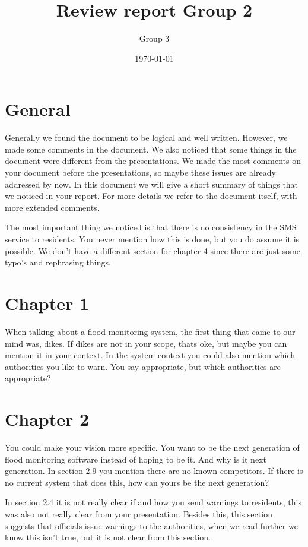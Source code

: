 \documentclass[a4paper,10pt]{article}
\author{Group 3}
\date{\today}
\title{Review report Group 2}
\begin{document}
\maketitle

\section{General}
Generally we found the document to be logical and well written. However, we made some comments in the document. We also noticed that some things in the document were different from the presentations. We made the most comments on your document before the presentations, so maybe these issues are already addressed by now. In this document we will give a short summary of things that we noticed in your report. For more details we refer to the document itself, with more extended comments. 

The most important thing we noticed is that there is no consistency in the SMS service to residents. You never mention how this is done, but you do assume it is possible. We don't have a different section for chapter 4 since there are just some typo's and rephrasing things. 

\section{Chapter 1}
When talking about a flood monitoring system, the first thing that came to our mind was, dikes. If dikes are not in your scope, thats oke, but maybe you can mention it in your context. In the system context you could also mention which authorities you like to warn. You say appropriate, but which authorities are appropriate?

\section{Chapter 2}
You could make your vision more specific. You want to be the next generation of flood monitoring software instead of hoping to be it. And why is it next generation. In section 2.9 you mention there are no known competitors. If there is no current system that does this, how can yours be the next generation? 

In section 2.4 it is not really clear if and how you send warnings to residents, this was also not really clear from your presentation. Besides this, this section suggests that officials issue warnings to the authorities, when we read further we know this isn't true, but it is not clear from this section.
\end{document}
